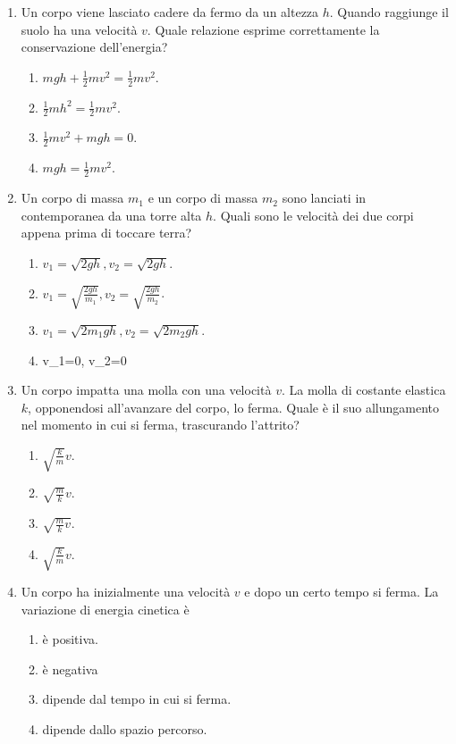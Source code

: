 \documentclass{article}
\begin{document}
\begin{enumerate}
\begin{enumerate}[label=\Alph*.]
  \end{enumerate}
  \item Un corpo viene lasciato cadere da fermo da un altezza $h$. Quando raggiunge il suolo ha una velocità $v$. Quale relazione esprime correttamente la conservazione dell'energia?
  \begin{enumerate}[label=\Alph*.]
    \item $mgh+\frac{1}{2}mv^2=\frac{1}{2}mv^2.$
    \item $\frac{1}{2}mh^2=\frac{1}{2}mv^2$.
    \item $\frac{1}{2}mv^2+mgh=0.$
    \item $mgh=\frac{1}{2}mv^2$.
  \end{enumerate}
  \item Un corpo di massa $m_1$ e un corpo di massa $m_2$ sono lanciati in contemporanea da una torre alta $h$. Quali sono le velocità dei due corpi appena prima di toccare terra?
  \begin{enumerate}[label=\Alph*.]
    \item $v_1=\sqrt{2gh}, v_2=\sqrt{2gh}$.
    \item $v_1=\sqrt{\frac{2gh}{m_1}}, v_2=\sqrt{\frac{2gh}{m_2}}$.
    \item $v_1=\sqrt{2m_1gh}, v_2=\sqrt{2m_2gh}$.
    \item v_1=0, v_2=0
  \end{enumerate}
  \item Un corpo impatta una molla con una velocità $v$. La molla di costante elastica $k$, opponendosi all'avanzare del corpo, lo ferma. Quale è il suo allungamento nel momento in cui si ferma, trascurando l'attrito?
  \begin{enumerate}[label=\Alph*.]
    \item $\sqrt{\frac{k}{m}}v$.
    \item $\sqrt{\frac{m}{k}}v$.
    \item $\sqrt{\frac{m}{k}v}$.
    \item $\sqrt{\frac{k}{m}}v$.
  \end{enumerate}
  \item Un corpo ha inizialmente una velocità $v$ e dopo un certo tempo si ferma. La variazione di energia cinetica è
  \begin{enumerate}[label=\Alph*.]
    \item è positiva.
    \item è negativa
    \item dipende dal tempo in cui si ferma.
    \item dipende dallo spazio percorso.

\end{enumerate}
\end{enumerate}
\end{document}
